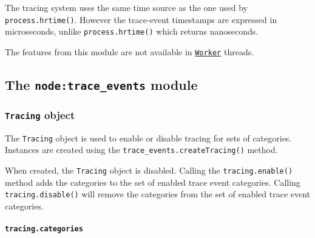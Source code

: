\begin{Shaded}
\begin{Highlighting}[]
\NormalTok{(}\OperatorTok{,}  \NormalTok{() \{}
  \NormalTok{(}\NormalTok{)}\OperatorTok{;}
  \NormalTok{(}\NormalTok{)}\OperatorTok{;}  
\NormalTok{\})}\OperatorTok{;}
\end{Highlighting}
\end{Shaded}

The tracing system uses the same time source as the one used by
\texttt{process.hrtime()}. However the trace-event timestamps are
expressed in microseconds, unlike \texttt{process.hrtime()} which
returns nanoseconds.

The features from this module are not available in
\href{worker_threads.md\#class-worker}{\texttt{Worker}} threads.

\subsection{\texorpdfstring{The \texttt{node:trace\_events}
module}{The node:trace\_events module}}\label{the-nodetrace_events-module}

\subsubsection{\texorpdfstring{\texttt{Tracing}
object}{Tracing object}}\label{tracing-object}

The \texttt{Tracing} object is used to enable or disable tracing for
sets of categories. Instances are created using the
\texttt{trace\_events.createTracing()} method.

When created, the \texttt{Tracing} object is disabled. Calling the
\texttt{tracing.enable()} method adds the categories to the set of
enabled trace event categories. Calling \texttt{tracing.disable()} will
remove the categories from the set of enabled trace event categories.

\paragraph{\texorpdfstring{\texttt{tracing.categories}}{tracing.categories}}\label{tracing.categories}

